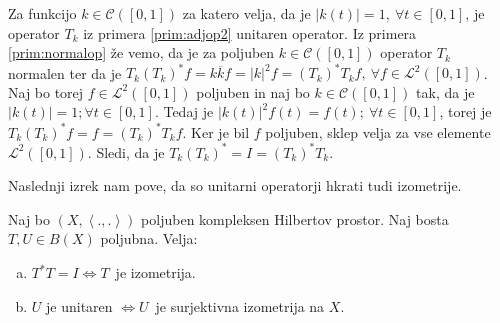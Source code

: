 \documentclass[mat2]{matdelo}
\newcommand{\abs}[1]{\ensuremath{\lvert #1 \rvert}}
\newcommand{\Sp}[2]{\ensuremath{\left<#1, #2\right>}}
\begin{document}
			\begin{primer}
				\label{prim:unitarop}
				Za funkcijo $k\in\mathcal{C}([0, 1])$ za katero velja, da je $\abs{k(t)} = 1,~\forall t\in [0, 1]$, je operator $T_k$ iz primera \ref{prim:adjop2} unitaren operator.
				Iz primera \ref{prim:normalop} že vemo, da je za poljuben $k\in\mathcal{C}([0, 1])$ operator $T_k$ normalen ter da je $T_k(T_k)^*f = k\overline{k}f =\abs{k}^2f= (T_k)^*T_kf,~\forall f\in\mathcal{L}^2([0, 1])$. Naj bo torej $f\in\mathcal{L}^2([0, 1])$ poljuben in naj bo $k\in\mathcal{C}([0, 1])$ tak, da je $\abs{k(t)}=1;\forall t\in[0, 1]$. Tedaj je $\abs{k(t)}^2f(t) = f(t);~\forall t\in[0, 1]$, torej je $T_k(T_k)^*f = f = (T_k)^*T_kf$. Ker je bil $f$ poljuben, sklep velja za vse elemente $\mathcal{L}^2([0, 1])$. Sledi, da je $T_k(T_k)^* = I = (T_k)^*T_k$.
			\end{primer}
			
			Naslednji izrek nam pove, da so unitarni operatorji hkrati tudi izometrije.
			
			\begin{izrek}
				\label{izr:uniizo}
				Naj bo $(X, \Sp{.}{.})$ poljuben kompleksen Hilbertov prostor. Naj bosta $T, U\in B(X)$ poljubna. Velja: \begin{enumerate}[a)]
					\item $T^*T = I \iff T$~je izometrija.
					\item $U$ je unitaren $\iff U$~je surjektivna izometrija na $X$.
				\end{enumerate}
			\end{izrek}
			
\end{document}
